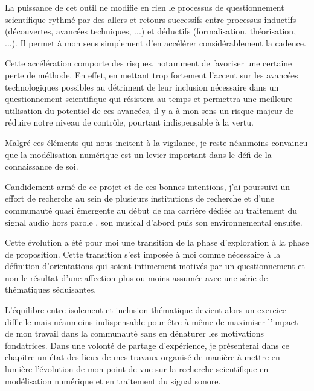 La puissance de cet outil ne modifie en rien le processus de questionnement scientifique rythmé par des allers et retours successifs entre processus inductifs (découvertes, avancées techniques, ...) et déductifs (formalisation, théorisation, ...). Il permet à mon sens simplement d'en accélérer considérablement la cadence.

Cette accélération comporte des risques, notamment de favoriser une certaine perte de méthode. En effet, en mettant trop fortement l'accent sur les avancées technologiques possibles au détriment de leur inclusion nécessaire dans un questionnement scientifique qui résistera au temps et permettra une meilleure utilisation du potentiel de ces avancées, il y a à mon sens un risque majeur de réduire notre niveau de contrôle, pourtant indispensable à la vertu.

Malgré ces éléments qui nous incitent à la vigilance, je reste néanmoins convaincu que la modélisation numérique est un levier important dans le défi de la connaissance de soi.

Candidement armé de ce projet et de ces bonnes intentions, j'ai poursuivi un effort de recherche au sein de plusieurs institutions de recherche et d'une communauté quasi émergente au début de ma carrière dédiée au traitement du signal audio \og hors parole \fg, son musical d'abord puis son environnemental ensuite. %

Cette évolution a été pour moi une transition de la phase d'exploration à la phase de proposition. Cette transition s'est imposée à moi comme nécessaire à la définition d'orientations qui soient intimement motivés par un questionnement et non le résultat d'une affection plus ou moins assumée avec une série de thématiques séduisantes.

L'équilibre entre isolement et inclusion thématique devient alors un exercice difficile mais néanmoins indispensable pour être à même de maximiser l'impact de mon travail dans la communauté sans en dénaturer les motivations fondatrices. Dans une volonté de partage d'expérience, je présenterai dans ce chapitre un état des lieux de mes travaux organisé de manière à mettre en lumière l'évolution de mon point de vue sur la recherche scientifique en modélisation numérique et en traitement du signal sonore.

